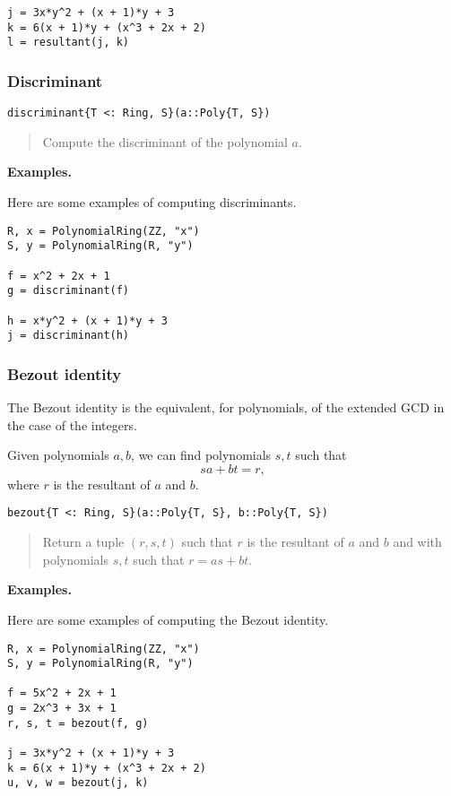 \documentclass[a4paper,10pt]{article}
\newcommand{\desc}[1]{\vspace{-3mm}\begin{quote}#1\end{quote}}
\begin{document}
{{{\begin{lstlisting}
j = 3x*y^2 + (x + 1)*y + 3
k = 6(x + 1)*y + (x^3 + 2x + 2)
l = resultant(j, k)
\end{lstlisting}

\subsubsection{Discriminant}

\begin{lstlisting}
discriminant{T <: Ring, S}(a::Poly{T, S})
\end{lstlisting}

\desc{Compute the discriminant of the polynomial $a$.}

\textbf{Examples.}

Here are some examples of computing discriminants.

\begin{lstlisting}
R, x = PolynomialRing(ZZ, "x")
S, y = PolynomialRing(R, "y")

f = x^2 + 2x + 1
g = discriminant(f)

h = x*y^2 + (x + 1)*y + 3
j = discriminant(h)
\end{lstlisting}

\subsubsection{Bezout identity}

The Bezout identity is the equivalent, for polynomials, of the extended GCD
in the case of the integers.

Given polynomials $a, b$, we can find polynomials $s, t$ such that
$$sa + bt = r,$$
where $r$ is the resultant of $a$ and $b$.

\begin{lstlisting}
bezout{T <: Ring, S}(a::Poly{T, S}, b::Poly{T, S})
\end{lstlisting}

\desc{Return a tuple $(r, s, t)$ such that $r$ is the resultant of $a$ and $b$
and with polynomials $s, t$ such that $r = as + bt$.}

\textbf{Examples.}

Here are some examples of computing the Bezout identity.

\begin{lstlisting}
R, x = PolynomialRing(ZZ, "x")
S, y = PolynomialRing(R, "y")

f = 5x^2 + 2x + 1
g = 2x^3 + 3x + 1
r, s, t = bezout(f, g)

j = 3x*y^2 + (x + 1)*y + 3
k = 6(x + 1)*y + (x^3 + 2x + 2)
u, v, w = bezout(j, k)
\end{lstlisting}

}}}
\end{document}
